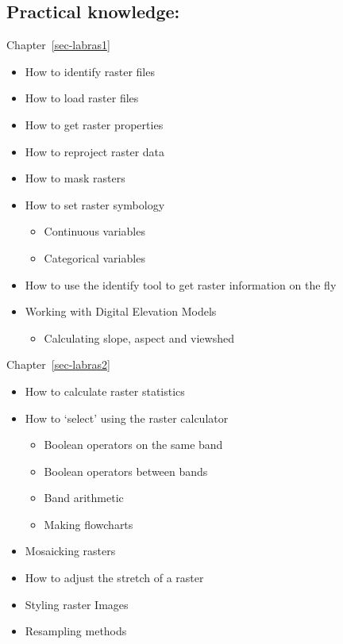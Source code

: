 \documentclass[
  letterpaper,
  DIV=11,
  numbers=noendperiod]{scrreprt}
\providecommand{\tightlist}{%
  \setlength{\itemsep}{0pt}\setlength{\parskip}{0pt}}\usepackage{longtable,booktabs,array}
\begin{document}
\subsection*{Practical knowledge:}\label{practical-knowledge-2}

Chapter~\ref{sec-labras1}

\begin{itemize}
\tightlist
\item
  How to identify raster files
\item
  How to load raster files
\item
  How to get raster properties
\item
  How to reproject raster data
\item
  How to mask rasters
\item
  How to set raster symbology

  \begin{itemize}
  \tightlist
  \item
    Continuous variables
  \item
    Categorical variables
  \end{itemize}
\item
  How to use the identify tool to get raster information on the fly
\item
  Working with Digital Elevation Models

  \begin{itemize}
  \tightlist
  \item
    Calculating slope, aspect and viewshed
  \end{itemize}
\end{itemize}

Chapter~\ref{sec-labras2}

\begin{itemize}
\tightlist
\item
  How to calculate raster statistics
\item
  How to `select' using the raster calculator

  \begin{itemize}
  \tightlist
  \item
    Boolean operators on the same band
  \item
    Boolean operators between bands
  \item
    Band arithmetic
  \item
    Making flowcharts
  \end{itemize}
\item
  Mosaicking rasters
\item
  How to adjust the stretch of a raster
\item
  Styling raster Images
\item
  Resampling methods
\end{itemize}
\end{document}
